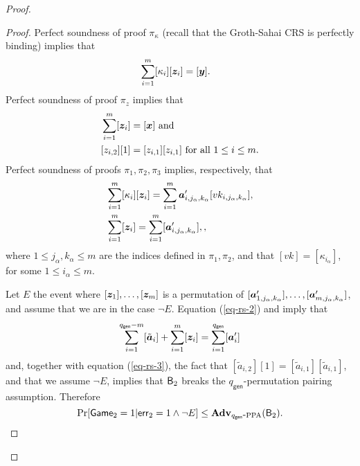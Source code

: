 \begin{proof}
\begin{proof}
Perfect soundness of proof $\pi_\kappa$  (recall that the Groth-Sahai CRS is perfectly binding)  implies that
\begin{align*}
&\sum_{i=1}^{m}[\kappa_i][{\boldsymbol{z}}_i]=[{\boldsymbol{y}}].
\end{align*}
Perfect soundness of proof $\pi_z$ implies that
\begin{align}
&\sum_{i=1}^{m}[{\boldsymbol{z}}_i]=[{\boldsymbol{x}}]\text{ and}\nonumber\\
&[z_{i,2}][1]=[z_{i,1}][z_{i,1}] \text{ for all }1\leq i\leq m.\label{eq-rs-3}
\end{align}
Perfect soundness of proofs $\pi_1,\pi_2,\pi_3$ implies, respectively, that
\begin{align}
&\sum_{i=1}^{m}[\kappa_i][{\boldsymbol{z}}_i]=\sum_{i=1}^{m}{\boldsymbol{a}}'_{i,j_\alpha,k_\alpha}[vk_{i,j_\alpha,k_\alpha}],\label{eq-rs-1}\\
&\sum_{i=1}^{m}[{\boldsymbol{z}}_i]=\sum_{i=1}^{m}[{\boldsymbol{a}}'_{i,j_\alpha,k_\alpha}], \label{eq-rs-2},
\end{align}
where $1\leq j_\alpha,k_\alpha\leq m$ are the indices defined in $\pi_1,\pi_2$, and that $[vk]=[\kappa_{i_\alpha}]$, for some $1\leq i_\alpha\leq m$.

Let $E$ the event where $[{\boldsymbol{z}}_1],\ldots,[{\boldsymbol{z}}_m]$ is a permutation of $[{\boldsymbol{a}}'_{1,j_\alpha,k_\alpha}],\allowbreak\ldots,\allowbreak[{\boldsymbol{a}}'_{m,j_\alpha,k_\alpha}]$, and assume that we are in the case $\neg E$.
Equation (\ref{eq-rs-2}) and imply that
$$
\sum_{i=1}^{q_\mathsf{gen}-m}[\tilde{{\boldsymbol{a}}}_i]+\sum_{i=1}^{m}[{\boldsymbol{z}}_i] = \sum_{i=1}^{q_\mathsf{gen}}[{\boldsymbol{a}}'_i]
$$
and, together with equation (\ref{eq-rs-3}), the fact that $[\tilde{a}_{i,2}][1]=[\tilde{a}_{i,1}][\tilde{a}_{i,1}]$, and that we assume $\neg E$, implies that 
$\mathsf{B}_2$ breaks the ${q_\mathsf{gen}}$-permutation pairing assumption. Therefore
$$\Pr[\mathsf{Game}_2=1|\mathsf{err}_2=1 \wedge\neg E]\leq\mathbf{Adv}_{{q_\mathsf{gen}}\mbox{-}\mathrm{PPA}}(\mathsf{B}_2).$$


\end{proof}
\end{proof}
